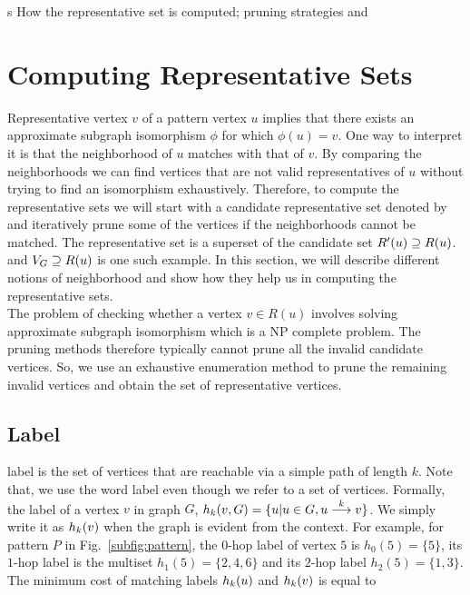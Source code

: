 s How the representative set is computed; pruning strategies and

\section{Computing Representative Sets}
 Representative vertex $v$ of a pattern vertex $u$ implies that there
 exists an approximate subgraph isomorphism $\phi$ for which $\phi(u) = v$.
 One way to interpret it is that the neighborhood of $u$ matches with
 that of $v$.  By comparing the neighborhoods we can find 
 vertices that are not valid representatives of $u$ without trying to
 find an isomorphism exhaustively. Therefore, to compute the
 representative sets we will start with a candidate 
 representative set denoted by \CR  and iteratively
 prune some of the vertices if the neighborhoods cannot be matched.
 The representative set is a superset of the candidate set $\CR \supseteq \RS$.
 and $\vg \supseteq \RS$ is one such example.
  In this section, we will
 describe different notions of neighborhood and show how they
 help us in computing the representative
 sets. \\
The problem of checking whether a vertex $v \in R(u)$
 involves solving
 approximate subgraph isomorphism which is a NP complete
 problem. The pruning methods therefore 
 typically cannot prune all the invalid
 candidate vertices. 
 So, we use an exhaustive enumeration method to prune the remaining
invalid vertices and obtain the set of representative
vertices.

 \subsection{\khop Label}
 \khop label 
 is the set of vertices that are reachable via a simple
 path of length $k$. 
 Note that, we use the word label even though we refer to a set of vertices.
 Formally, the \khop label of a vertex
 $v$ in graph $G$, $\khopl{k}{v,G} = \{u | u \in G, \kpath{u}{v}{k}\}$.
 We simply write it as $\khopl{k}{v}$ when the graph is evident from
 the context. 
For example, for pattern $P$ in
Fig.~\ref{subfig:pattern}, the $0$-hop label of vertex $5$ is $h_0(5)
 = \{5\}$, its $1$-hop label is the multiset $h_1(5) = \{2, 4, 6\}$ 
 and its $2$-hop label $h_2(5) = \{1, 3\}$. The minimum 
 cost of matching \khop labels
 $\khopl{k}{u}$ and $\khopl{k}{v}$ is equal to 

